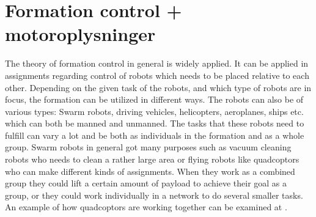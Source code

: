 \section{Formation control + motoroplysninger}

The theory of formation control in general is widely applied. It can be applied in assignments regarding control of robots which needs to be placed relative to each other. Depending on the given task of the robots, and which type of robots are in focus, the formation can be utilized in different ways. The robots can also be of various types: Swarm robots, driving vehicles, helicopters, aeroplanes, ships etc. which can both be manned and unmanned. The tasks that these robots need to fulfill can vary a lot and be both as individuals in the formation and as a whole group. Swarm robots in general got many purposes such as vacuum cleaning robots who needs to clean a rather large area or flying robots like quadcoptors who can make different kinds of assignments. When they work as a combined group they could lift a certain amount of payload to achieve their goal as a group, or they could work individually in a network to do several smaller tasks. An example of how quadcoptors are working together can be examined at \citep{ethswarm}.

